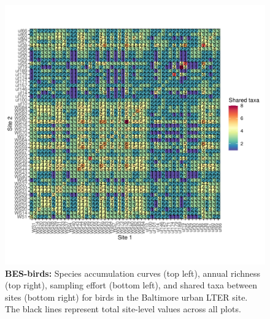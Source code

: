 \documentclass[11pt, oneside]{article}
\begin{document}
\begin{figure}[h!]
\includegraphics[scale = 0.4]{bes-birds-nilon_spp_shared.pdf}
\caption{{\bf BES-birds:} Species accumulation curves (top left),  annual richness (top right), sampling effort (bottom left), and shared taxa between sites (bottom right) for birds in the Baltimore urban LTER site. The black lines represent total site-level values across all plots.}
\label{bes-birds}
\end{figure}



\renewcommand{\refname}{\subsection*{References}}

\end{document}
